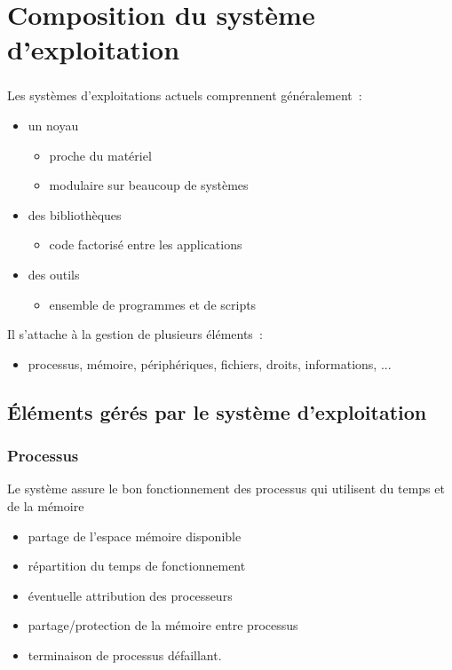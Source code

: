 \section{Composition du système d'exploitation}
\begin{frame}
\frametitle{\insertsection}
Les systèmes d'exploitations actuels comprennent généralement~:
\begin{itemize}
\item un \alert{noyau}
\begin{itemize}
\item[\ding{212}] proche du matériel
\item[\ding{212}] modulaire sur beaucoup de systèmes
\end{itemize}
\item des \alert{bibliothèques}
  \begin{itemize}
  \item[\ding{212}] code factorisé entre les applications
  \end{itemize}
\item des \alert{outils}
\begin{itemize}
  \item[\ding{212}] ensemble de programmes et de scripts
\end{itemize}
\end{itemize}
\vspace{0.5cm}
Il s'attache à la gestion de plusieurs éléments~:
\begin{itemize}
\item processus, mémoire, périphériques, fichiers, droits, informations, ...  
\end{itemize}
\end{frame}


\subsection{Éléments gérés par le système d'exploitation}

\begin{frame}
\frametitle{Processus}
Le système assure le bon fonctionnement des \alert{processus} qui utilisent
du temps et de la mémoire
\begin{itemize}
\item \alert{partage de l'espace mémoire} disponible
\item \alert{répartition du temps} de fonctionnement
\item éventuelle attribution des processeurs
\item partage/\alert{protection} de la mémoire entre processus
\item terminaison de processus défaillant.
\end{itemize}
\end{frame}

